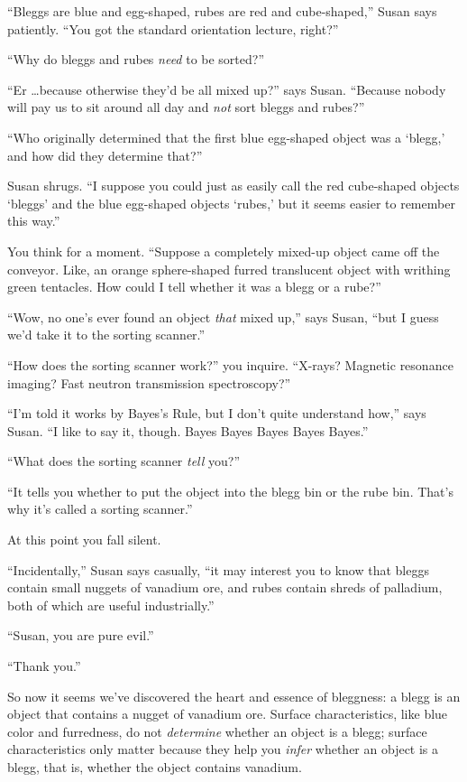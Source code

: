 {
 ``Bleggs are blue and egg-shaped, rubes are red
and cube-shaped,'' Susan says patiently.
``You got the standard orientation lecture,
right?''}

{
 ``Why do bleggs and rubes \textit{need} to be
sorted?''}

{
 ``Er \ldots because otherwise
they'd be all mixed up?'' says Susan.
``Because nobody will pay us to sit around all day and
\textit{not} sort bleggs and rubes?''}

{
 ``Who originally determined that the first blue
egg-shaped object was a `blegg,' and how
did they determine that?''}

{
 Susan shrugs. ``I suppose you could just as
easily call the red cube-shaped objects
`bleggs' and the blue egg-shaped objects
`rubes,' but it seems easier to remember
this way.''}

{
 You think for a moment. ``Suppose a completely
mixed-up object came off the conveyor. Like, an orange sphere-shaped
furred translucent object with writhing green tentacles. How could I
tell whether it was a blegg or a rube?''}

{
 ``Wow, no one's ever found an
object \textit{that} mixed up,'' says Susan,
``but I guess we'd take it to the
sorting scanner.''}

{
 ``How does the sorting scanner
work?'' you inquire. ``X-rays?
Magnetic resonance imaging? Fast neutron transmission
spectroscopy?''}

{
 ``I'm told it works by
Bayes's Rule, but I don't quite
understand how,'' says Susan. ``I
like to say it, though. Bayes Bayes Bayes Bayes
Bayes.''}

{
 ``What does the sorting scanner \textit{tell}
you?''}

{
 ``It tells you whether to put the object into the
blegg bin or the rube bin. That's why
it's called a sorting scanner.''}

{
 At this point you fall silent.}

{
 ``Incidentally,'' Susan says
casually, ``it may interest you to know that bleggs
contain small nuggets of vanadium ore, and rubes contain shreds of
palladium, both of which are useful industrially.''}

{
 ``Susan, you are pure evil.''}

{
 ``Thank you.''}

{
 So now it seems we've discovered the heart and
essence of bleggness: a blegg is an object that contains a nugget of
vanadium ore. Surface characteristics, like blue color and furredness,
do not \textit{determine} whether an object is a blegg; surface
characteristics only matter because they help you \textit{infer}
whether an object is a blegg, that is, whether the object contains
vanadium.}

